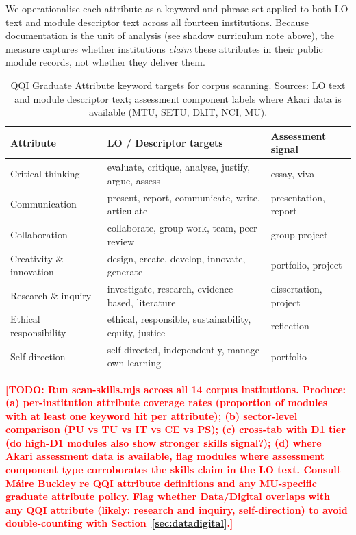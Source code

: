 \documentclass[12pt, a4paper]{article}
\newcommand{\todo}[1]{\textcolor{red}{\textbf{[TODO: #1]}}}
\begin{document}
We operationalise each attribute as a keyword and phrase set applied to both LO
text and module descriptor text across all fourteen institutions. Because
documentation is the unit of analysis (see shadow curriculum note above), the
measure captures whether institutions \textit{claim} these attributes in their
public module records, not whether they deliver them.

\begin{table}[H]
\centering
\caption{QQI Graduate Attribute keyword targets for corpus scanning.
Sources: LO text and module descriptor text; assessment component labels where
Akari data is available (MTU, SETU, DkIT, NCI, MU).}
\label{tab:skills-targets}
\begin{tabularx}{\textwidth}{lXl}
\toprule
\textbf{Attribute} & \textbf{LO / Descriptor targets} & \textbf{Assessment signal} \\
\midrule
Critical thinking & evaluate, critique, analyse, justify, argue, assess & essay, viva \\
Communication & present, report, communicate, write, articulate & presentation, report \\
Collaboration & collaborate, group work, team, peer review & group project \\
Creativity \& innovation & design, create, develop, innovate, generate & portfolio, project \\
Research \& inquiry & investigate, research, evidence-based, literature & dissertation, project \\
Ethical responsibility & ethical, responsible, sustainability, equity, justice & reflection \\
Self-direction & self-directed, independently, manage own learning & portfolio \\
\bottomrule
\end{tabularx}
\end{table}

\todo{Run scan-skills.mjs across all 14 corpus institutions. Produce: (a) per-institution
attribute coverage rates (proportion of modules with at least one keyword hit per
attribute); (b) sector-level comparison (PU vs TU vs IT vs CE vs PS); (c) cross-tab
with D1 tier (do high-D1 modules also show stronger skills signal?); (d) where Akari
assessment data is available, flag modules where assessment component type corroborates
the skills claim in the LO text. Consult Máire Buckley re QQI attribute definitions
and any MU-specific graduate attribute policy. Flag whether Data/Digital overlaps
with any QQI attribute (likely: research and inquiry, self-direction) to avoid
double-counting with Section~\ref{sec:datadigital}.}
\end{document}
